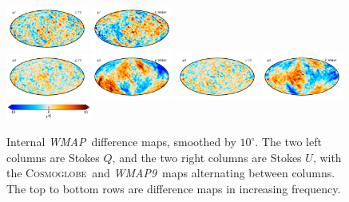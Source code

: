 \documentclass[twocolumn]{../../common/aa}
\def\WMAP{\emph{WMAP}}
\def\WMAPnine{\emph{WMAP9}}
\newcommand{\cosmoglobe}{\textsc{Cosmoglobe}}
\begin{document}
\begin{figure}
	\includegraphics[width=0.24\textwidth]{figures/V_deltaU.pdf}
	\includegraphics[width=0.24\textwidth]{figures/V_W_deltaU.pdf}\\
	\includegraphics[width=0.24\textwidth]{figures/W_deltaQ.pdf}
	\includegraphics[width=0.24\textwidth]{figures/W_W_deltaQ.pdf}
	\includegraphics[width=0.24\textwidth]{figures/W_deltaU.pdf}
	\includegraphics[width=0.24\textwidth]{figures/W_W_deltaU.pdf}
        \includegraphics[width=0.25\textwidth]{figures/cbar_10uK.pdf}
	\caption{Internal \WMAP\ difference maps, smoothed by $10^\circ$. The two left columns are Stokes $Q$, and the two right columns are Stokes $U$, with the \cosmoglobe\ and \WMAPnine\ maps alternating between columns. The top to bottom rows are difference maps in increasing frequency.}
	\label{fig:internal_diff}


\end{figure}
\end{document}
